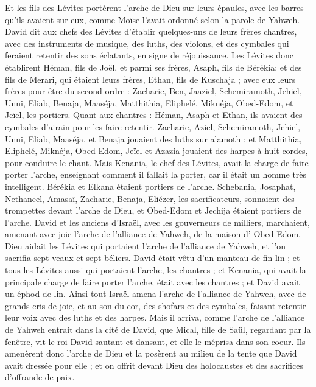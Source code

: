\begin{multicols}{2}
Et les fils des Lévites portèrent l’arche de Dieu sur leurs épaules, avec les barres qu'ils avaient sur eux, comme Moïse l'avait ordonné selon la parole de Yahweh.
David dit aux chefs des Lévites d'établir quelques-uns de leurs frères chantres, avec des instruments de musique, des luths, des violons, et des cymbales qui feraient retentir des sons éclatants, en signe de réjouissance.
Les Lévites donc établirent Héman, fils de Joël, et parmi ses frères, Asaph, fils de Bérékia; et des fils de Merari, qui étaient leurs frères, Ethan, fils de Kuschaja ;
avec eux leurs frères pour être du second ordre : Zacharie, Ben, Jaaziel, Schemiramoth, Jehiel, Unni, Eliab, Benaja, Maaséja, Matthithia, Eliphelé, Miknéja, Obed-Edom, et Jeïel, les portiers.
Quant aux chantres : Héman, Asaph et Ethan, ils avaient des cymbales d'airain pour les faire retentir.
Zacharie, Aziel, Schemiramoth, Jehiel, Unni, Eliab, Maaséja, et Benaja jouaient des luths sur alamoth ;
et Matthithia, Eliphelé, Miknéja, Obed-Edom, Jeïel et Azazia jouaient des harpes à huit cordes, pour conduire le chant.
Mais Kenania, le chef des Lévites, avait la charge de faire porter l’arche, enseignant comment il fallait la porter, car il était un homme très intelligent.
Bérékia et Elkana étaient portiers de l’arche.
Schebania, Josaphat, Nethaneel, Amasaï, Zacharie, Benaja, Eliézer, les sacrificateurs, sonnaient des trompettes devant l’arche de Dieu, et Obed-Edom et Jechija étaient portiers de l’arche.
David et les anciens d'Israël, avec les gouverneurs de milliers, marchaient, amenant avec joie l’arche de l'alliance de Yahweh, de la maison d' Obed-Edom.
Dieu aidait les Lévites qui portaient l’arche de l'alliance de Yahweh, et l’on sacrifia sept veaux et sept béliers.
David était vêtu d'un manteau de fin lin ; et tous les Lévites aussi qui portaient l’arche, les chantres ;  et Kenania, qui avait la principale charge de faire porter l’arche, était avec les chantres ; et David avait un éphod de lin.
Ainsi tout Israël amena l’arche de l'alliance de Yahweh, avec de grands cris de joie, et au son du cor, des shofars et des cymbales, faisant retentir leur voix avec des luths et des harpes.
Mais il arriva, comme l’arche de l'alliance de Yahweh entrait dans la cité de David, que Mical, fille de Saül, regardant par la fenêtre, vit le roi David sautant et dansant, et elle le méprisa dans son coeur.
\VerseOne{}Ils amenèrent donc l’arche de Dieu et la posèrent au milieu de la tente que David avait dressée pour elle ; et on offrit devant Dieu des holocaustes et des sacrifices d’offrande de paix.

\end{multicols}
